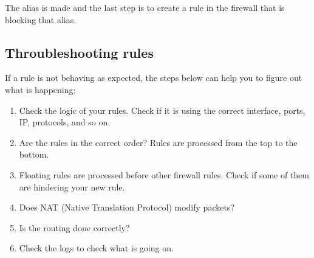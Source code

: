 The alias is made and the last step is to create a rule in the firewall that is blocking that alias.



\subsection{Throubleshooting rules}
If a rule is not behaving as expected, the steps below can help you to figure out what is happening:
\begin{enumerate}
    \item Check the logic of your rules. Check if it is using the correct interface, ports, IP, protocols, and so on.
    \item Are the rules in the correct order? Rules are processed from the top to the bottom.
    \item Floating rules are processed before other firewall rules. Check if some of them are hindering your new rule.
    \item Does NAT (Native Translation Protocol) modify packets?
    \item Is the routing done correctly?
    \item Check the logs to check what is going on.
\end{enumerate}

